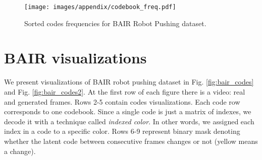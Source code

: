 \documentclass{article}
\begin{document}
\begin{figure}[h!]
\centering
\texttt{[image: images/appendix/codebook\_freq.pdf]}
\caption{Sorted codes frequencies for BAIR Robot Pushing dataset.} 
\label{fig:codebook_freq}
\end{figure}






\begin{table}[ht!]
\centering
\caption{Effects of applying adaptive input / softmax in decoder architecture. The results are obtained using the model with a single frame subscaling. Latent space is modelled with }
\label{table:adaptive}
\end{table}

\section{BAIR visualizations}

We present visualizations of BAIR robot pushing dataset in Fig. \ref{fig:bair_codes} and Fig. \ref{fig:bair_codes2}. At the first row of each figure there is a video:  real and  generated frames. Rows 2-5 contain codes visualizations. Each code row corresponds to one codebook. Since a single code is just a matrix of indexes, we decode it with a technique called \textit{indexed color}. In other words, we assigned each index in a code to a specific color. Rows 6-9 represent binary mask denoting whether the latent code between consecutive frames changes or not (yellow means a change).
 
\end{document}
